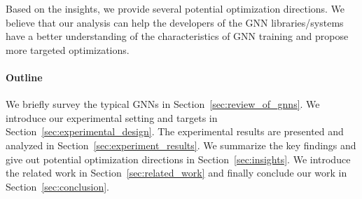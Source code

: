 Based on the insights, we provide several potential optimization directions.
We believe that our analysis can help the developers of the GNN libraries/systems have a better understanding of the characteristics of GNN training and propose more targeted optimizations.

\paragraph{Outline}
We briefly survey the typical GNNs in Section~\ref{sec:review_of_gnns}.
We introduce our experimental setting and targets in Section~\ref{sec:experimental_design}.
The experimental results are presented and analyzed in Section~\ref{sec:experiment_results}.
We summarize the key findings and give out potential optimization directions in Section~\ref{sec:insights}.
We introduce the related work in Section~\ref{sec:related_work} and finally conclude our work in Section~\ref{sec:conclusion}.
